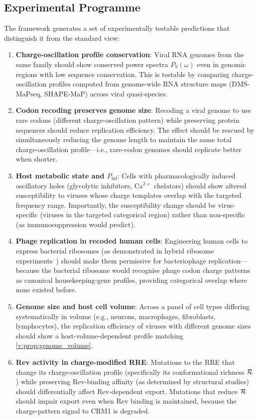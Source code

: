 \subsection{Experimental Programme}

The framework generates a set of experimentally testable predictions that distinguish it from the standard view:

\begin{enumerate}[(P1)]
  \item \textbf{Charge-oscillation profile conservation}: Viral RNA genomes from the same family should show conserved power spectra $P_V(\omega)$ even in genomic regions with low sequence conservation. This is testable by comparing charge-oscillation profiles computed from genome-wide RNA structure maps (DMS-MaPseq, SHAPE-MaP) across viral quasi-species.

  \item \textbf{Codon recoding preserves genome size}: Recoding a viral genome to use rare codons (different charge-oscillation pattern) while preserving protein sequences should reduce replication efficiency. The effect should be rescued by simultaneously reducing the genome length to maintain the same total charge-oscillation profile---i.e., rare-codon genomes should replicate better when shorter.

  \item \textbf{Host metabolic state and $P_{\mathrm{inf}}$}: Cells with pharmacologically induced oscillatory holes (glycolytic inhibitors, Ca$^{2+}$ chelators) should show altered susceptibility to viruses whose charge templates overlap with the targeted frequency range. Importantly, the susceptibility change should be virus-specific (viruses in the targeted categorical region) rather than non-specific (as immunosuppression would predict).

  \item \textbf{Phage replication in recoded human cells}: Engineering human cells to express bacterial ribosomes (as demonstrated in hybrid ribosome experiments~\cite{Schmied2014}) should make them permissive for bacteriophage replication---because the bacterial ribosome would recognise phage codon charge patterns as canonical housekeeping-gene profiles, providing categorical overlap where none existed before.

  \item \textbf{Genome size and host cell volume}: Across a panel of cell types differing systematically in volume (e.g., neurons, macrophages, fibroblasts, lymphocytes), the replication efficiency of viruses with different genome sizes should show a host-volume-dependent profile matching \cref{v:prop:genome_volume}.

  \item \textbf{Rev activity in charge-modified RRE}: Mutations to the RRE that change its charge-oscillation profile (specifically its conformational richness $\mathcal{R}$) while preserving Rev-binding affinity (as determined by structural studies) should differentially affect Rev-dependent export. Mutations that reduce $\mathcal{R}$ should impair export even when Rev binding is maintained, because the charge-pattern signal to CRM1 is degraded.
\end{enumerate}

